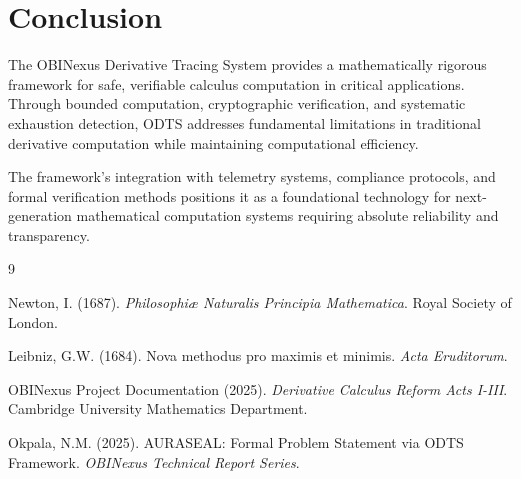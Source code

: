 \documentclass[12pt,a4paper]{article}
\begin{document}
\section{Conclusion}

The OBINexus Derivative Tracing System provides a mathematically rigorous framework for safe, verifiable calculus computation in critical applications. Through bounded computation, cryptographic verification, and systematic exhaustion detection, ODTS addresses fundamental limitations in traditional derivative computation while maintaining computational efficiency.

The framework's integration with telemetry systems, compliance protocols, and formal verification methods positions it as a foundational technology for next-generation mathematical computation systems requiring absolute reliability and transparency.


\begin{thebibliography}{9}

Newton, I. (1687). \emph{Philosophiæ Naturalis Principia Mathematica}. Royal Society of London.

Leibniz, G.W. (1684). Nova methodus pro maximis et minimis. \emph{Acta Eruditorum}.

OBINexus Project Documentation (2025). \emph{Derivative Calculus Reform Acts I-III}. Cambridge University Mathematics Department.

Okpala, N.M. (2025). AURASEAL: Formal Problem Statement via ODTS Framework. \emph{OBINexus Technical Report Series}.

\end{thebibliography}
\end{document}

